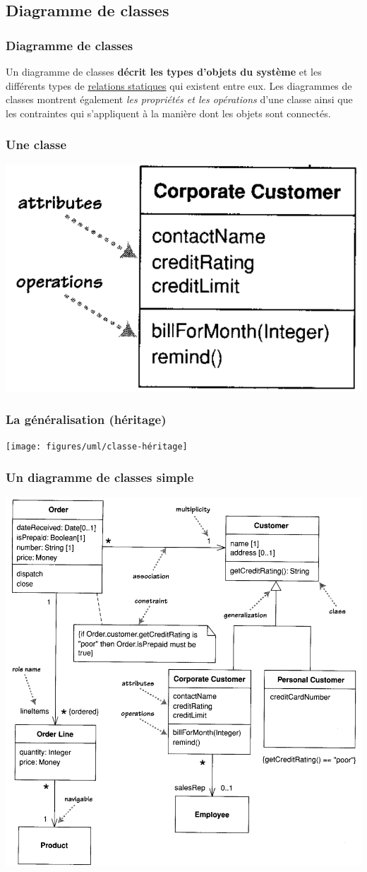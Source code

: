 \subsection{Diagramme de classes}
\label{subsec:diagramme-classes}

\begin{frame}
    \frametitle{Diagramme de classes}
    Un diagramme de classes \textbf{décrit les types d'objets du système}
    et les différents types de \underline{relations statiques} qui existent entre eux.
    Les diagrammes de classes montrent également
    \emph{les propriétés et les opérations} d'une classe
    ainsi que les contraintes qui s'appliquent à la manière dont les objets sont connectés.
\end{frame}

\begin{frame}
    \frametitle{Une classe}
    \centering
    \includegraphics[height=0.5\linewidth]{figures/uml/classe}
\end{frame}

\begin{frame}
    \frametitle{La généralisation (héritage)}
    \centering
    \texttt{[image: figures/uml/classe-héritage]}
\end{frame}

\begin{frame}
    \frametitle{Un diagramme de classes simple}
    \centering
    \includegraphics[height=0.5\linewidth]{figures/uml/classe-complet}
\end{frame}

